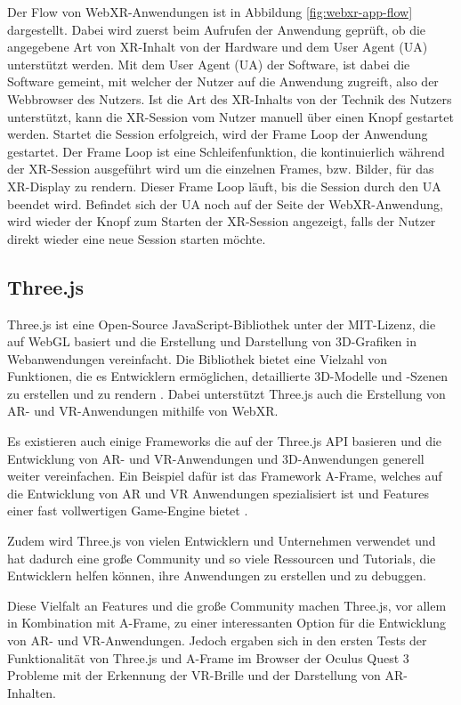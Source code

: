 Der Flow von WebXR-Anwendungen ist in Abbildung \ref{fig:webxr-app-flow} dargestellt.
Dabei wird zuerst beim Aufrufen der Anwendung geprüft, ob die angegebene Art von XR-Inhalt von der Hardware und dem User Agent (UA) unterstützt werden.
Mit dem User Agent (UA) der Software, ist dabei die Software gemeint, mit welcher der Nutzer auf die Anwendung zugreift, also der Webbrowser des Nutzers.
Ist die Art des XR-Inhalts von der Technik des Nutzers unterstützt, kann die XR-Session vom Nutzer manuell über einen Knopf gestartet werden.
Startet die Session erfolgreich, wird der Frame Loop der Anwendung gestartet.
Der Frame Loop ist eine Schleifenfunktion, die kontinuierlich während der XR-Session ausgeführt wird um die einzelnen Frames, bzw. Bilder, für das XR-Display zu rendern.
Dieser Frame Loop läuft, bis die Session durch den UA beendet wird.
Befindet sich der UA noch auf der Seite der WebXR-Anwendung, wird wieder der Knopf zum Starten der XR-Session angezeigt, falls der Nutzer direkt wieder eine neue Session starten möchte.

\subsection{Three.js}

Three.js ist eine Open-Source JavaScript-Bibliothek unter der MIT-Lizenz, die auf WebGL basiert und die Erstellung und Darstellung von 3D-Grafiken in Webanwendungen vereinfacht.
Die Bibliothek bietet eine Vielzahl von Funktionen, die es Entwicklern ermöglichen, detaillierte 3D-Modelle und -Szenen zu erstellen und zu rendern \autocite[][]{threejs-docs}.
Dabei unterstützt Three.js auch die Erstellung von AR- und VR-Anwendungen mithilfe von WebXR.

Es existieren auch einige Frameworks die auf der Three.js API basieren und die Entwicklung von AR- und VR-Anwendungen und 3D-Anwendungen generell weiter vereinfachen.
Ein Beispiel dafür ist das Framework A-Frame, welches auf die Entwicklung von AR und VR Anwendungen spezialisiert ist und Features einer fast vollwertigen Game-Engine bietet \autocite[]{a-frame-introduction}.

Zudem wird Three.js von vielen Entwicklern und Unternehmen verwendet und hat dadurch eine große Community und so viele Ressourcen und Tutorials, die Entwicklern helfen können, ihre Anwendungen zu erstellen und zu debuggen.

Diese Vielfalt an Features und die große Community machen Three.js, vor allem in Kombination mit A-Frame, zu einer interessanten Option für die Entwicklung von AR- und VR-Anwendungen.
Jedoch ergaben sich in den ersten Tests der Funktionalität von Three.js und A-Frame im Browser der Oculus Quest 3 Probleme mit der Erkennung der VR-Brille und der Darstellung von AR-Inhalten.

